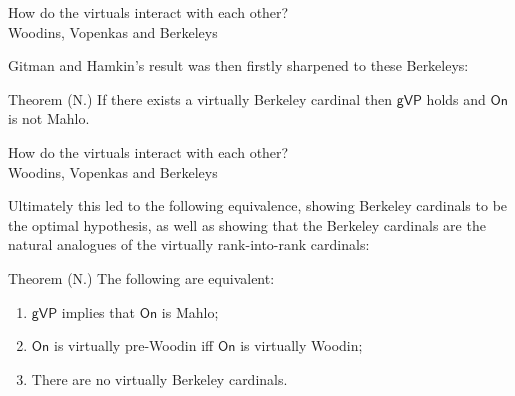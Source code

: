 \documentclass{beamer}
\begin{document}
\begin{frame}{How do the virtuals interact with each other? \\
              {\small Woodins, Vopenkas and Berkeleys}}

  Gitman and Hamkin's result was then firstly sharpened to these Berkeleys:

  \begin{block}{Theorem (N.)}
    If there exists a virtually Berkeley cardinal then $\textsf{gVP}$ holds and $\textsf{On}$ is not Mahlo.
  \end{block}


\end{frame}

\begin{frame}{How do the virtuals interact with each other? \\
              {\small Woodins, Vopenkas and Berkeleys}}

  Ultimately this led to the following equivalence, showing Berkeley cardinals to be the optimal hypothesis, as well as showing that the Berkeley cardinals are the \alert<1>{natural analogues} of the virtually rank-into-rank cardinals:

  \begin{block}{Theorem (N.)}
    The following are equivalent: 
    \begin{enumerate}
      \item $\textsf{gVP}$ implies that $\textsf{On}$ is Mahlo;
      \item $\textsf{On}$ is virtually pre-Woodin iff $\textsf{On}$ is virtually Woodin;
      \item There are no virtually Berkeley cardinals.
    \end{enumerate}
  \end{block}

\end{frame}
\end{document}
